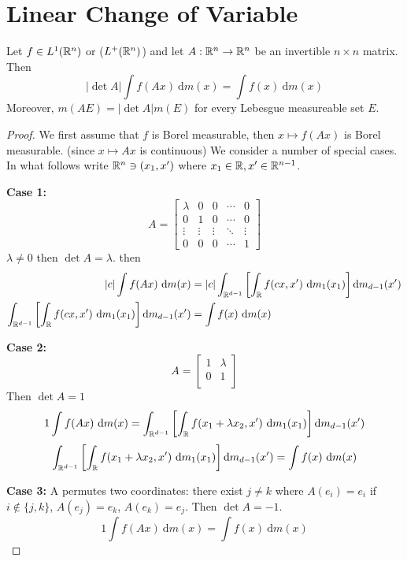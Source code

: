 \section{Linear Change of Variable}
\begin{theorem}
  Let $f \in L^1(\mathbb R^n)$ or ($L^+(\mathbb R^n)$) and let $A: \mathbb R^n \to \mathbb R^n$ be an invertible $n \times n$ matrix. Then 
  \[|\det A| \int f(Ax) \ \mathrm{d}m(x) = \int f(x) \ \mathrm{d}m(x)\]
  Moreover, $m(AE) = |\det A| m(E)$
  for every Lebesgue measureable set $E$.
\end{theorem}
\begin{proof}
  We first assume that $f$ is Borel measurable, then $x \mapsto f(Ax)$ is Borel measurable.
  (since $x \mapsto Ax$ is continuous) We consider a number of special cases.
  In what follows write $\mathbb R^n \ni (x_1, x')$ where $x_1 \in \mathbb R, x' \in \mathbb R^{n-1}$.

  \textbf{Case 1:}
  \[ A = \begin{bmatrix}
    \lambda & 0 & 0 & \dotsm & 0 \\
    0 & 1 & 0 & \dotsm & 0 \\
    \vdots & \vdots & \vdots & \ddots & \vdots \\
    0 & 0 & 0 & \dotsm & 1
  \end{bmatrix}\]
  $\lambda  \neq 0$ then $\det A = \lambda$. then 
  \begin{align*}
    |c| \int f(Ax)\ \mathrm{d}m(x) &= |c|\int_{\RR^{d-1}} \left[\int_\RR f(cx, x') \ \mathrm{d}m_1(x_1)\right]\mathrm{d}m_{d-1}(x') \\
    \int_{\RR^{d-1}} \left[\int_\RR f(cx, x') \ \mathrm{d}m_1(x_1)\right]\mathrm{d}m_{d-1}(x') &= \int f(x) \ \mathrm{d}m(x) 
  \end{align*}

  \textbf{Case 2:}
  \[A = \begin{bmatrix}
    1 & \lambda \\
    0 & 1  \\
  \end{bmatrix}\]
  Then $\det A = 1$ 
  \[1 \int f(Ax) \ \mathrm{d}m(x) = \int_{\RR^{d-1}}\left[\int_\RR f(x_1 + \lambda x_2, x')\ \mathrm{d}m_1(x_1)\right] \mathrm{d}m_{d-1}(x') \]
  \[\int_{\RR^{d-1}}\left[\int_\RR f(x_1 + \lambda x_2, x')\ \mathrm{d}m_1(x_1)\right] \mathrm{d}m_{d-1}(x') = \int f(x) \ \mathrm{d}m(x)\]

  \textbf{Case 3:} A permutes two coordinates: there exist $j \neq k$ 
  where $A(e_i) = e_i$ if $i \not\in \{j, k\}$, $A(e_j) = e_k$, $A(e_k) = e_j$.
  Then $\det A = -1$.
  \[1 \int f(Ax) \ \mathrm{d}m(x) = \int f(x) \ \mathrm{d}m(x)\]


\end{proof}
